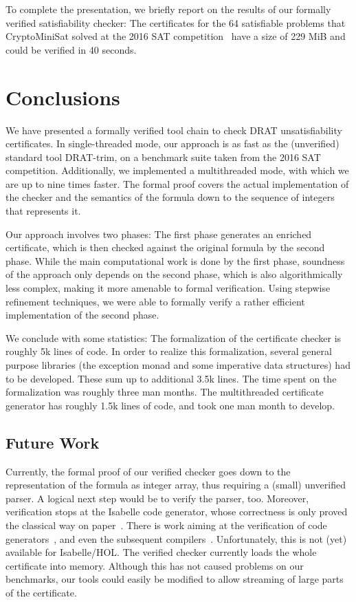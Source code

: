 \documentclass{llncs}
\begin{document}
To complete the presentation, we briefly report on the results of our formally verified satisfiability checker:
The certificates for the 64 satisfiable problems that CryptoMiniSat solved at the 2016 SAT competition~\cite{satcomp-2016} have a size of 229 MiB and could be verified in 40 seconds.

\section{Conclusions}\label{sec:concl}
We have presented a formally verified tool chain to check DRAT unsatisfiability certificates. 
In single-threaded mode, our approach is as fast as the (unverified) standard tool DRAT-trim, on a benchmark 
suite taken from the 2016 SAT competition. Additionally, we implemented a multithreaded mode, with 
which we are up to nine times faster.
The formal proof covers the actual implementation of the checker and the semantics of the 
formula down to the sequence of integers that represents it.

Our approach involves two phases: The first phase generates an enriched certificate, 
which is then checked against the original formula by the second phase.
While the main computational work is done by the first phase, soundness of the approach 
only depends on the second phase, which is also algorithmically less complex, making it more amenable to formal verification. 
Using stepwise refinement techniques, we were able to formally verify a rather efficient implementation of the second phase.

We conclude with some statistics: The formalization of the certificate checker is roughly 5k lines of code.
In order to realize this formalization, several general purpose libraries (\eg the exception monad and some imperative data structures) had to be developed. 
These sum up to additional 3.5k lines. The time spent on the formalization was roughly three man months. The multithreaded certificate generator has roughly 1.5k 
lines of code, and took one man month to develop.

\subsection{Future Work}
Currently, the formal proof of our verified checker goes down to the representation of the formula as integer array,
thus requiring a (small) unverified parser. A logical next step would be to verify the parser, too.
Moreover, verification stops at the Isabelle code generator, whose correctness is only proved the classical way on paper~\cite{HaNi10,HKKN13}. 
There is work aiming at the verification of code generators~\cite{MO14}, and even the subsequent compilers~\cite{KMNO14}. 
Unfortunately, this is not (yet) available for Isabelle/HOL. 
The verified checker currently loads the whole certificate into memory. Although this has not caused problems on our benchmarks, 
our tools could easily be modified to allow streaming of large parts of the certificate.
\end{document}
